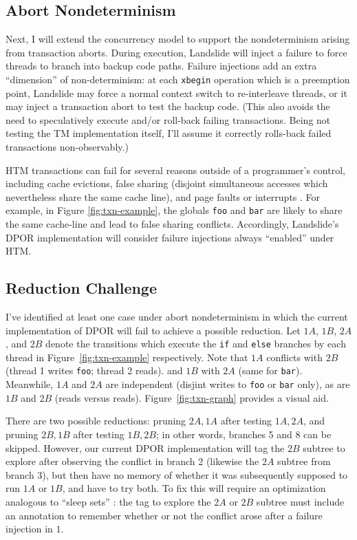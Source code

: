 \subsection{Abort Nondeterminism}
Next, I will extend the concurrency model to support the nondeterminism arising from transaction aborts.
During execution, Landslide will inject a failure to force threads to branch into backup code paths.
Failure injections add an extra ``dimension'' of non-determinism:
at each {\tt xbegin} operation which is a preemption point, Landslide may force a normal context switch to re-interleave threads, or it may inject a transaction abort to test the backup code.
(This also avoids the need to speculatively execute and/or roll-back failing transactions.
Being not testing the TM implementation itself, I'll assume it correctly rolls-back failed transactions non-observably.)

HTM transactions can fail for several reasons outside of a programmer's control,
including cache evictions,
false sharing (disjoint simultaneous accesses which nevertheless share the same cache line),
and page faults or interrupts \cite{si-tm}.
For example, in Figure \ref{fig:txn-example}, the globals {\tt foo} and {\tt bar} are likely to share the same cache-line and lead to false sharing conflicts.
Accordingly, Landslide's DPOR implementation will consider failure injections always ``enabled'' under HTM.

\subsection{Reduction Challenge}
\label{sec:tm-reduction-challenge}
I've identified at least one case under abort nondeterminism in which the current implementation of DPOR will fail to achieve a possible reduction.
Let $1A$, $1B$, $2A$, and $2B$ denote the transitions which execute the {\tt if} and {\tt else} branches by each thread in Figure~\ref{fig:txn-example} respectively.
Note that $1A$ conflicts with $2B$ (thread 1 writes {\tt foo}; thread 2 reads). and $1B$ with $2A$ (same for {\tt bar}).
Meanwhile, $1A$ and $2A$ are independent (disjint writes to {\tt foo} or {\tt bar} only), as are $1B$ and $2B$ (reads versus reads).
Figure~\ref{fig:txn-graph} provides a visual aid.

There are two possible reductions: pruning $2A,1A$ after testing $1A,2A$, and pruning $2B,1B$ after testing $1B,2B$;
in other words, branches 5 and 8 can be skipped.
However, %
our current DPOR implementation will tag the $2B$ subtree to explore after observing the conflict in branch 2 (likewise the $2A$ subtree from branch 3),
but then have no memory of whether it was subsequently supposed to run $1A$ or $1B$, and have to try both.
To fix this will require an optimization analogous to ``sleep sets'' \cite{dpor}:
the tag to explore the $2A$ or $2B$ subtree must include an annotation to remember whether or not the conflict arose after a failure injection in $1$.


